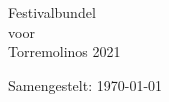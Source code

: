 \documentclass[10pt,a4paper,twoside]{article}
\begin{document}
\noindent

\begin{center}
\Huge{Festivalbundel\\voor\\Torremolinos 2021}
\end{center}
\vspace*{\fill}
\tableofcontents
\vspace{1em}
\hfill\small{Samengestelt: \today}
\clearpage

\newpage
\newpage
{}\newpage
{}\newpage
\null\newpage
\newpage
\newpage
\end{document}
